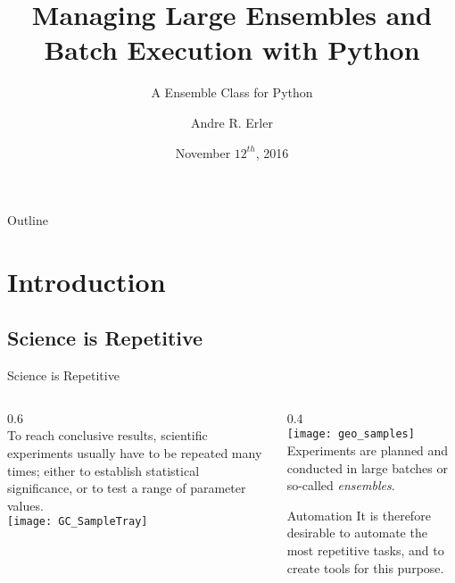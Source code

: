 \documentclass[hyperref={pdfpagelabels=false},compress,final]{beamer}
\title[Large Ensembles with Python]{Managing Large Ensembles and Batch Execution with Python}
\subtitle{A Ensemble Class for Python}
\author[\href{http://www.physics.utoronto.ca/~aerler/}{Andre R. Erler} (\href{mailto:A.R.Erler@gmail.com}{A.R.Erler@gmail.com})]{Andre R. Erler}
\institute{PyCon Canada}
\date{November $12^{th}$, 2016}
\newenvironment{myGreenBox}[3][upper=upgreen,lower=lowgreen,shadow=true]%
{\begin{center} \begin{minipage}{#2} \begin{beamerboxesrounded}[#1]{#3} \smallskip}%
      {\smallskip \end{beamerboxesrounded} \end{minipage} \end{center}}
\begin{document}

\begin{frame}
\titlepage
\end{frame}

\begin{frame}{Outline}
\tableofcontents%
\end{frame}




\section{Introduction}


\subsection[Repetitive Science]{Science is Repetitive}

\begin{frame}{Science is Repetitive}
 \begin{columns}
   \begin{column}{0.6\textwidth}
     \small \medskip\\
     To reach conclusive results, scientific experiments usually have to be repeated many times; either to establish statistical significance, or to test a range of parameter values.\\ 
     \bigskip 
     \hspace*{-1cm}
     \texttt{[image: GC\_SampleTray]}
   \end{column}
   \begin{column}{0.4\textwidth}
     \vspace*{-1.cm}\\%
     \texttt{[image: geo\_samples]}\\
    \bigskip 
     \small Experiments are planned and conducted in large batches or so-called \textit{ensembles}.\\ \smallskip
     \begin{myGreenBox}[shadow=true]{0.85\textwidth}{Automation}
       \small It is therefore desirable to automate the most repetitive tasks, and to create tools for this purpose.
     \end{myGreenBox}
  \end{column}
 \end{columns}
\end{frame}
\end{document}
